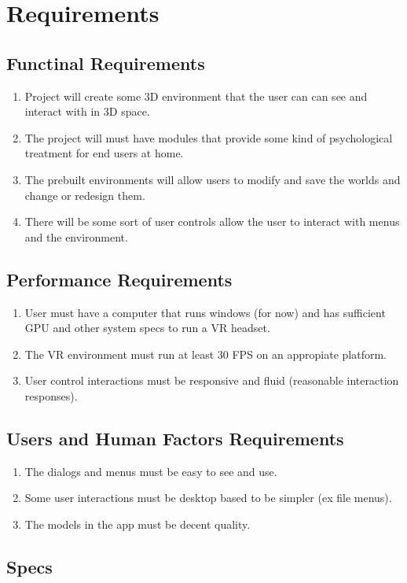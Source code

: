 \documentclass[a4paper,10pt]{article}
\begin{document}
	\section{Requirements}
	\subsection{Functinal Requirements}
	\begin{enumerate}
		\item Project will create some 3D environment that the user can can see and interact with in 3D space.
		\item The project will must have modules that provide some kind of psychological treatment for end users at home.
		\item The prebuilt environments will allow users to modify and save the worlds and change or redesign them.
		\item There will be some sort of user controls allow the user to interact with menus and the environment.
	\end{enumerate}
	
	\subsection{Performance Requirements}
	\begin{enumerate}
		\item User must have a computer that runs windows (for now) and has sufficient GPU and other system specs to run a VR headset.
		\item The VR environment must run at least 30 FPS on an appropiate platform.
		\item User control interactions must be responsive and fluid (reasonable interaction responses).
	\end{enumerate}
	\subsection{Users and Human Factors Requirements}
	\begin{enumerate}
		\item The dialogs and menus must be easy to see and use.
		\item Some user interactions must be desktop based to be simpler (ex file menus).
		\item The models in the app must be decent quality.
	\end{enumerate}
	\subsection{Specs}
\end{document}
